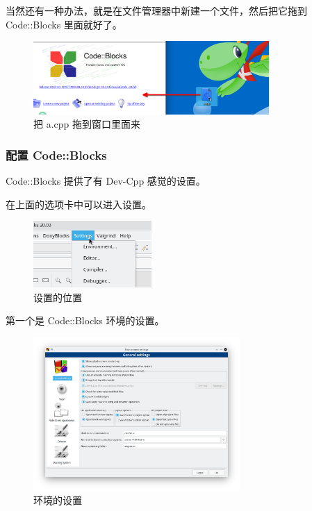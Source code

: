 \documentclass[UTF-8]{ctexart}
\begin{document}
				当然还有一种办法，就是在文件管理器中新建一个文件，然后把它拖到 Code::Blocks 里面就好了。
				
				\begin{figure}[H]
					\centering
					\includegraphics[width=0.8\textwidth]{fig/cb_new_file_drag.png}
					\caption*{把 a.cpp 拖到窗口里面来}
				\end{figure}
			
			\subsubsection{配置 Code::Blocks}
			
				Code::Blocks 提供了有 Dev-Cpp 感觉的设置。
				
				在上面的选项卡中可以进入设置。
				
				\begin{figure}[H]
					\centering
					\includegraphics[width=0.4\textwidth]{fig/cb_settings.png}
					\caption*{设置的位置}
				\end{figure}
			
				第一个是 Code::Blocks 环境的设置。
				
				\begin{figure}[H]
					\centering
					\includegraphics[width=0.7\textwidth]{fig/cb_settings_environment.png}
					\caption*{环境的设置}
				\end{figure}
			
\end{document}
